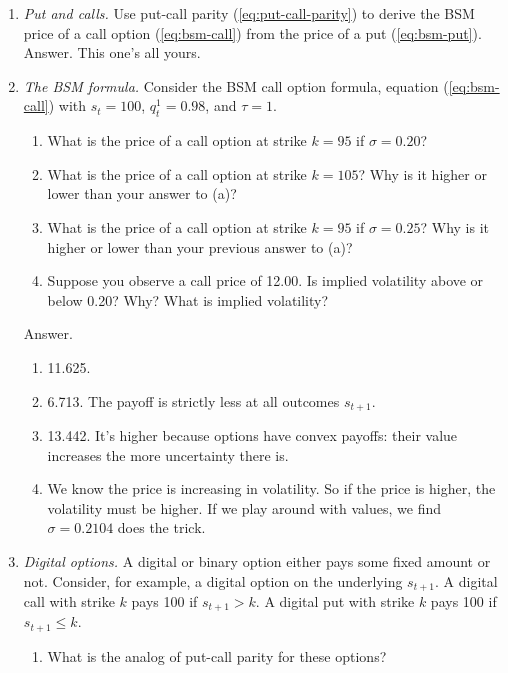 \documentclass[11pt]{article}
\begin{document}
\begin{enumerate}
\item {\it Put and calls.\/}
Use put-call parity (\ref{eq:put-call-parity})
to derive the BSM price of a call option (\ref{eq:bsm-call})
from the price of a put (\ref{eq:bsm-put}).
%
Answer.  This one's all yours.

\item {\it The BSM formula.\/}
Consider the BSM call option formula, equation (\ref{eq:bsm-call})
with $s_t = 100$, $q^1_t = 0.98$, and $\tau = 1$.
%
\begin{enumerate}
\item What is the price of a call option at strike $k = 95$ if $\sigma = 0.20$?
\item What is the price of a call option at strike $k=105$?
Why is it higher or lower than your answer to (a)?
\item What is the price of a call option at strike $k = 95$ if $\sigma = 0.25$?
Why is it higher or lower than your previous answer to (a)?
\item Suppose you observe a call price of 12.00.
Is implied volatility above or below 0.20?
Why?
What is implied volatility?
\end{enumerate}
%
Answer.
\begin{enumerate}
\item 11.625.
\item 6.713. The payoff is strictly less at all outcomes $s_{t+1}$.
\item 13.442.
It's higher because options have convex payoffs:
their value increases the more uncertainty there is.
\item We know the price is increasing in volatility.
So if the price is higher, the volatility must be higher.
If we play around with values, we find $\sigma = 0.2104$ does the trick.
\end{enumerate}

\item {\it Digital options.\/}
A digital or binary option either pays some fixed amount or not.
Consider, for example, a digital option on the underlying $s_{t+1}$.
A digital call with strike $k$ pays 100 if $s_{t+1} > k$.
A digital put with strike $k$ pays 100 if $s_{t+1} \leq k$.
%
\begin{enumerate}
\item What is the analog of put-call parity for these options?


\end{enumerate}
\end{enumerate}
\end{document}

